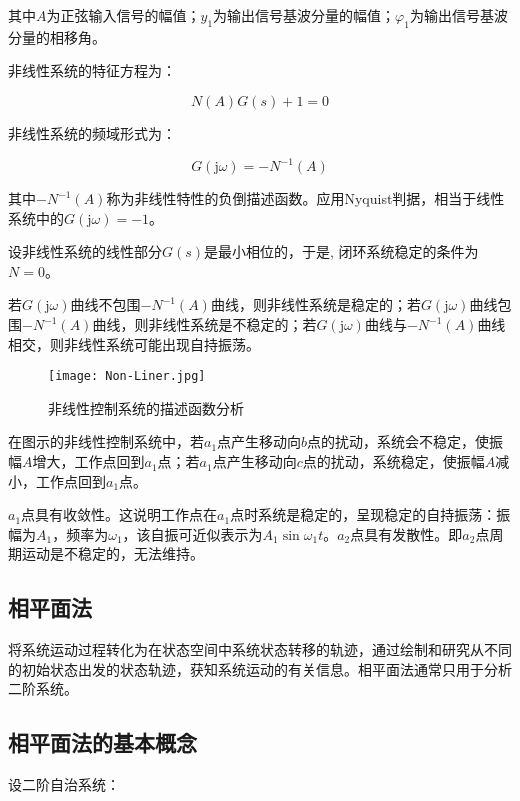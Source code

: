 \documentclass[cn, blue, normal, 12pt]{elegantnote}
\begin{document}
其中$A$为正弦输入信号的幅值；$y_1$为输出信号基波分量的幅值；$\varphi_1$为输出信号基波分量的相移角。

非线性系统的特征方程为：

\begin{equation}
    N(A)G(s)+1=0
\end{equation}

非线性系统的频域形式为：

\begin{equation}
    G(\mathrm{j}\omega)=-N^{-1}(A)
\end{equation}

其中$-N^{-1}(A)$称为非线性特性的负倒描述函数。应用Nyquist判据，相当于线性系统中的$G(\mathrm{j}\omega)=-1$。

设非线性系统的线性部分$G(s)$是最小相位的，于是, 闭环系统稳定的条件为$N=0$。

若$G(\mathrm{j}\omega)$曲线不包围$-N^{-1}(A)$曲线，则非线性系统是稳定的；若$G(\mathrm{j}\omega)$曲线包围$-N^{-1}(A)$曲线，则非线性系统是不稳定的；若$G(\mathrm{j}\omega)$曲线与$-N^{-1}(A)$曲线相交，则非线性系统可能出现自持振荡。

\begin{figure}[htbp]
    \centering
    \texttt{[image: Non-Liner.jpg]}
    \caption{非线性控制系统的描述函数分析}
\end{figure}

在图示的非线性控制系统中，若$a_1$点产生移动向$b$点的扰动，系统会不稳定，使振幅$A$增大，工作点回到$a_1$点；若$a_1$点产生移动向$c$点的扰动，系统稳定，使振幅$A$减小，工作点回到$a_1$点。

$a_1$点具有收敛性。这说明工作点在$a_1$点时系统是稳定的，呈现稳定的自持振荡：振幅为$A_1$，频率为$\omega_1$，该自振可近似表示为$A_1\sin{\omega_1 t}$。$a_2$点具有发散性。即$a_2$点周期运动是不稳定的，无法维持。

\subsection{相平面法}

将系统运动过程转化为在状态空间中系统状态转移的轨迹，通过绘制和研究从不同的初始状态出发的状态轨迹，获知系统运动的有关信息。相平面法通常只用于分析二阶系统。

\subsection{相平面法的基本概念}

设二阶自治系统：
\end{document}
